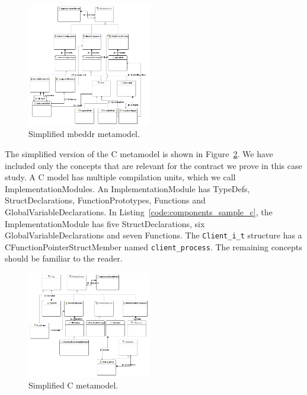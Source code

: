\begin{figure}
\begin{center}
  \includegraphics[width=0.48\textwidth]{figures/Moduleclassdiagram}
  \caption{Simplified mbeddr metamodel. }
  \label{fig:Moduleclassdiagram}
\end{center}
\end{figure}

The simplified version of the C metamodel is shown in Figure~\ref{fig:CModelclassdiagram}. 
We have included only the concepts that are relevant for the contract we prove in this case study.
A C model has multiple compilation units, which we call ImplementationModules. An ImplementationModule has TypeDefs, StructDeclarations, FunctionPrototypes, Functions and GlobalVariableDeclarations.
In Listing~\ref{code:components_sample_c}, the ImplementationModule has five StructDeclarations, six GlobalVariableDeclarations and seven Functions.
The \verb=Client_i_t= structure has a CFunctionPointerStructMember named \verb=client_process=. The remaining concepts should be familiar to the reader.

\begin{figure}
\begin{center}
  \includegraphics[width=0.48\textwidth]{figures/CModelclassdiagram}
  \caption{Simplified C metamodel. }
  \label{fig:CModelclassdiagram}
\end{center}
\end{figure}



